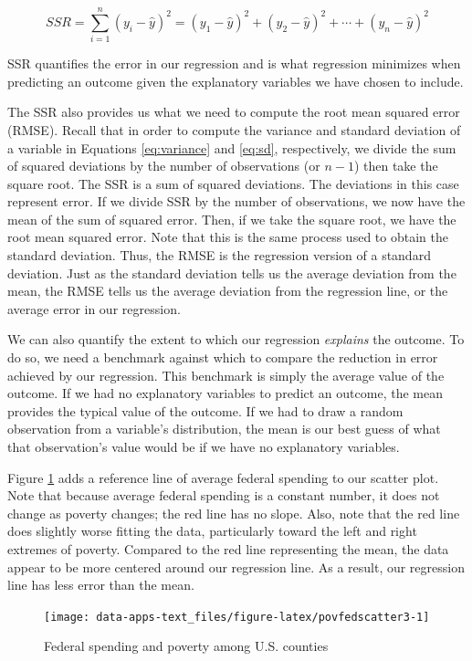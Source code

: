 \documentclass[
]{book}
\begin{document}
\begin{equation}
SSR=\sum _{i=1}^{n}(y_{i}-\hat{y})^2= (y_{1}-\hat{y})^2+(y_{2}-\hat{y})^2+\cdots +(y_{n}-\hat{y})^2
\label{eq:ssr}
\end{equation}

SSR quantifies the error in our regression and is what regression minimizes when predicting an outcome given the explanatory variables we have chosen to include.

The SSR also provides us what we need to compute the root mean squared error (RMSE). Recall that in order to compute the variance and standard deviation of a variable in Equations \eqref{eq:variance} and \eqref{eq:sd}, respectively, we divide the sum of squared deviations by the number of observations (or \(n-1\)) then take the square root. The SSR is a sum of squared deviations. The deviations in this case represent error. If we divide SSR by the number of observations, we now have the mean of the sum of squared error. Then, if we take the square root, we have the root mean squared error. Note that this is the same process used to obtain the standard deviation. Thus, the RMSE is the regression version of a standard deviation. Just as the standard deviation tells us the average deviation from the mean, the RMSE tells us the average deviation from the regression line, or the average error in our regression.

We can also quantify the extent to which our regression \emph{explains} the outcome. To do so, we need a benchmark against which to compare the reduction in error achieved by our regression. This benchmark is simply the average value of the outcome. If we had no explanatory variables to predict an outcome, the mean provides the typical value of the outcome. If we had to draw a random observation from a variable's distribution, the mean is our best guess of what that observation's value would be if we have no explanatory variables.

Figure \ref{fig:povfedscatter3} adds a reference line of average federal spending to our scatter plot. Note that because average federal spending is a constant number, it does not change as poverty changes; the red line has no slope. Also, note that the red line does slightly worse fitting the data, particularly toward the left and right extremes of poverty. Compared to the red line representing the mean, the data appear to be more centered around our regression line. As a result, our regression line has less error than the mean.

\begin{figure}

{\centering \texttt{[image: data-apps-text\_files/figure-latex/povfedscatter3-1]} 

}

\caption{Federal spending and poverty among U.S. counties}\label{fig:povfedscatter3}
\end{figure}
\end{document}
